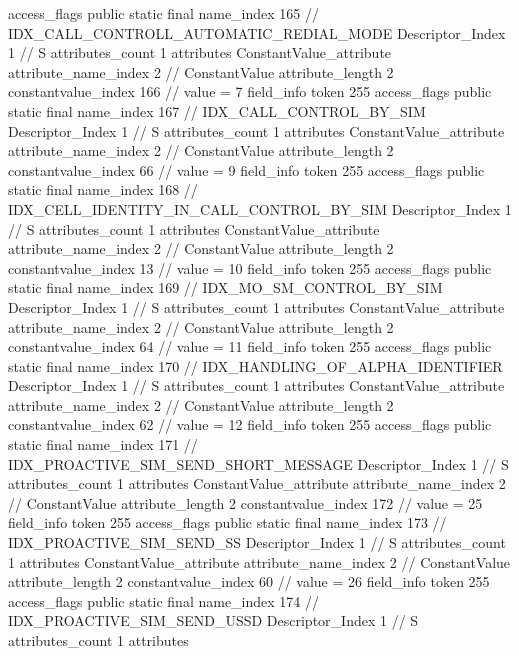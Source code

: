 {{{{{				access_flags	public static final
				name_index	165		// IDX_CALL_CONTROLL_AUTOMATIC_REDIAL_MODE
				Descriptor_Index	1		// S
				attributes_count	1
				attributes {
				ConstantValue_attribute {
					attribute_name_index	2		// ConstantValue
					attribute_length	2
					constantvalue_index	166		// value = 7
				}
				}
			}
			field_info {
				token	255
				access_flags	public static final
				name_index	167		// IDX_CALL_CONTROL_BY_SIM
				Descriptor_Index	1		// S
				attributes_count	1
				attributes {
				ConstantValue_attribute {
					attribute_name_index	2		// ConstantValue
					attribute_length	2
					constantvalue_index	66		// value = 9
				}
				}
			}
			field_info {
				token	255
				access_flags	public static final
				name_index	168		// IDX_CELL_IDENTITY_IN_CALL_CONTROL_BY_SIM
				Descriptor_Index	1		// S
				attributes_count	1
				attributes {
				ConstantValue_attribute {
					attribute_name_index	2		// ConstantValue
					attribute_length	2
					constantvalue_index	13		// value = 10
				}
				}
			}
			field_info {
				token	255
				access_flags	public static final
				name_index	169		// IDX_MO_SM_CONTROL_BY_SIM
				Descriptor_Index	1		// S
				attributes_count	1
				attributes {
				ConstantValue_attribute {
					attribute_name_index	2		// ConstantValue
					attribute_length	2
					constantvalue_index	64		// value = 11
				}
				}
			}
			field_info {
				token	255
				access_flags	public static final
				name_index	170		// IDX_HANDLING_OF_ALPHA_IDENTIFIER
				Descriptor_Index	1		// S
				attributes_count	1
				attributes {
				ConstantValue_attribute {
					attribute_name_index	2		// ConstantValue
					attribute_length	2
					constantvalue_index	62		// value = 12
				}
				}
			}
			field_info {
				token	255
				access_flags	public static final
				name_index	171		// IDX_PROACTIVE_SIM_SEND_SHORT_MESSAGE
				Descriptor_Index	1		// S
				attributes_count	1
				attributes {
				ConstantValue_attribute {
					attribute_name_index	2		// ConstantValue
					attribute_length	2
					constantvalue_index	172		// value = 25
				}
				}
			}
			field_info {
				token	255
				access_flags	public static final
				name_index	173		// IDX_PROACTIVE_SIM_SEND_SS
				Descriptor_Index	1		// S
				attributes_count	1
				attributes {
				ConstantValue_attribute {
					attribute_name_index	2		// ConstantValue
					attribute_length	2
					constantvalue_index	60		// value = 26
				}
				}
			}
			field_info {
				token	255
				access_flags	public static final
				name_index	174		// IDX_PROACTIVE_SIM_SEND_USSD
				Descriptor_Index	1		// S
				attributes_count	1
				attributes {
}}}}}}

